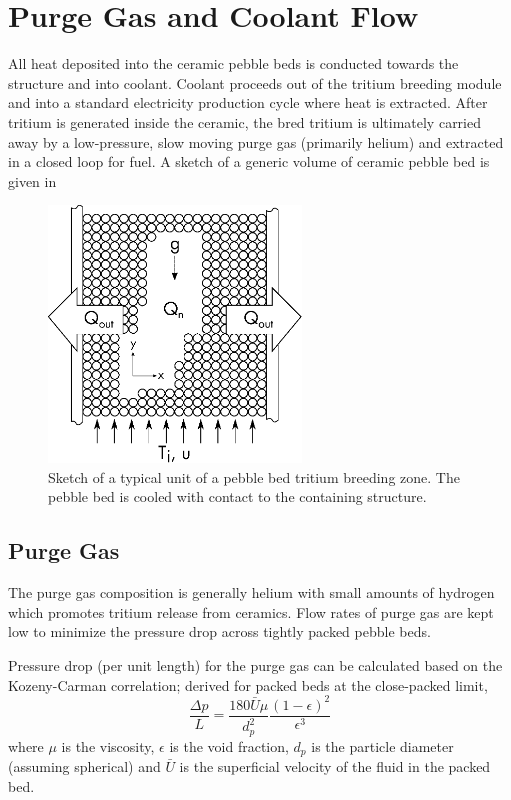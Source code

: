 \documentclass[11pt]{report} %
\begin{document}
\section{Purge Gas and Coolant Flow}
All heat deposited into the ceramic pebble beds is conducted towards the structure and into coolant. Coolant proceeds out of the tritium breeding module and into a standard electricity production cycle where heat is extracted. After tritium is generated inside the ceramic, the bred tritium is ultimately carried away by a low-pressure, slow moving purge gas (primarily helium) and extracted in a closed loop for fuel. A sketch of a generic volume of ceramic pebble bed is given in 

\begin{figure}[ht]
	\centering
	\includegraphics[width=0.6\textwidth]{images/x-domain} 
	\caption{Sketch of a typical unit of a pebble bed tritium breeding zone. The pebble bed is cooled with contact to the containing structure.}
	\label{fig:solid-breeder-sketch}
\end{figure}


\subsection{Purge Gas}
The purge gas composition is generally helium with small amounts of hydrogen which promotes tritium release from ceramics. Flow rates of purge gas are kept low to minimize the pressure drop across tightly packed pebble beds.

Pressure drop (per unit length) for the purge gas can be calculated based on the Kozeny-Carman correlation; derived for packed beds at the close-packed limit,
\begin{equation}\label{eq:K-C-pressure}
    \frac{\Delta p}{L} = \frac{180 \bar{U} \mu}{d_p^2} \frac{(1-\epsilon)^2}{\epsilon^3}
\end{equation}
where $\mu$ is the viscosity, $\epsilon$ is the void fraction, $d_p$ is the particle diameter (assuming spherical) and $\bar{U}$ is the superficial velocity of the fluid in the packed bed.
\end{document}
